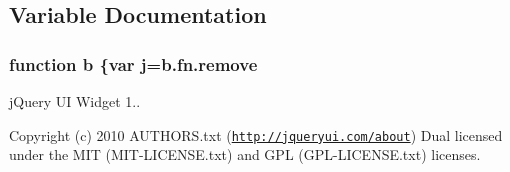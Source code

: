 \subsection{Variable Documentation}
\hypertarget{jquery-ui-tabs_8js_ac0431efac4d7c393d1e70b86115cb93f}{
\subsubsection[{b}]{\setlength{\rightskip}{0pt plus 5cm}function b \{var {\bf j}={\bf b.\+fn.\+remove}}}\label{jquery-ui-tabs_8js_ac0431efac4d7c393d1e70b86115cb93f}
j\+Query U\+I Widget 1..

Copyright (c) 2010 A\+U\+T\+H\+O\+R\+S.\+txt (\href{http://jqueryui.com/about}{\tt http\+://jqueryui.\+com/about}) Dual licensed under the M\+I\+T (M\+I\+T-\/\+L\+I\+C\+E\+N\+S\+E.\+txt) and G\+P\+L (G\+P\+L-\/\+L\+I\+C\+E\+N\+S\+E.\+txt) licenses.

